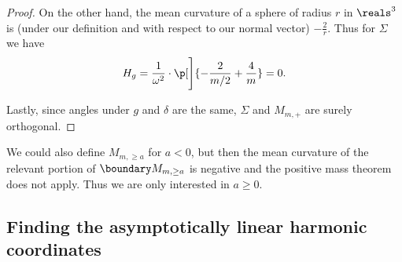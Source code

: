\documentclass[titlepage,numbers=noenddot,oneside,%
cleardoublepage=empty,paper=a4,fontsize=11pt,%
english,%
]{scrartcl}
\begin{document}
\begin{proof}
    On the other hand, the mean curvature of a sphere of radius \( r \) in \( \reals^3 \) is (under our definition and with respect to our normal vector) \( -\frac{2}{r} \). Thus for \( \Sigma \) we have
    \begin{equation*}
        H_g=\frac{1}{\omega^2}\cdot \p[\Bigg]{-\frac{2}{m/2}+\frac{4}{m}}=0.
    \end{equation*}

    Lastly, since angles under \( g \) and \( \delta \) are the same, \( \Sigma \) and \( M_{m,+} \) are surely orthogonal. 
\end{proof}

\begin{remark}
    We could also define \( M_{m,\geq a} \) for \( a<0 \), but then the mean curvature of the relevant portion of \( \modifiedschwarzschildboundary \) is negative and the positive mass theorem does not apply. Thus we are only interested in \( a\geq 0 \).
\end{remark}
\subsection{Finding the asymptotically linear harmonic coordinates}
\end{document}
